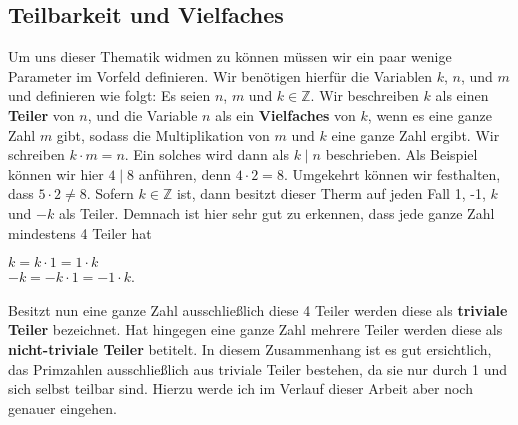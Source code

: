 \documentclass[german,12pt,a4paper]{article}
\begin{document}
\subsection{Teilbarkeit und Vielfaches}\label{Teilbarkeit und Vielfaches}
Um uns dieser Thematik widmen zu können müssen wir ein paar wenige Parameter im Vorfeld definieren.\newline
Wir benötigen hierfür die Variablen $k$, $n$, und $m$ und definieren wie folgt:\newline
Es seien $n$, $m$ und $k \in \mathbb{Z}$.
Wir beschreiben $k$ als einen \textbf{Teiler} von $n$, und die Variable $n$ als ein \textbf{Vielfaches} von $k$, wenn es eine ganze Zahl $m$ gibt, sodass die Multiplikation von $m$ und $k$ eine ganze Zahl ergibt.
Wir schreiben $k\cdot{m} = n$. Ein solches wird dann als $k \mid n$ beschrieben.\newline
Als Beispiel können wir hier $4 \mid 8$ anführen, denn $4 \cdot 2 = 8$.
Umgekehrt können wir festhalten, dass $5 \cdot 2 \neq 8$. \newline
Sofern $k \in \mathbb{Z}$ ist, dann besitzt dieser Therm auf jeden Fall 1, -1, $k$ und $-k$ als Teiler.
Demnach ist hier sehr gut zu erkennen, dass jede ganze Zahl mindestens 4 Teiler hat
\begin{center}
$k = k \cdot 1 = 1 \cdot k$\\
$-k = -k \cdot 1 = -1 \cdot k$.
\end{center}
Besitzt nun eine ganze Zahl ausschließlich diese 4 Teiler werden diese als \textbf{triviale Teiler} bezeichnet.
Hat hingegen eine ganze Zahl mehrere Teiler werden diese als \textbf{nicht-triviale Teiler} betitelt.
In diesem Zusammenhang ist es gut ersichtlich, das Primzahlen ausschließlich aus triviale Teiler bestehen, da sie nur durch 1 und sich selbst teilbar sind.
Hierzu werde ich im Verlauf dieser Arbeit aber noch genauer eingehen.
\end{document}
